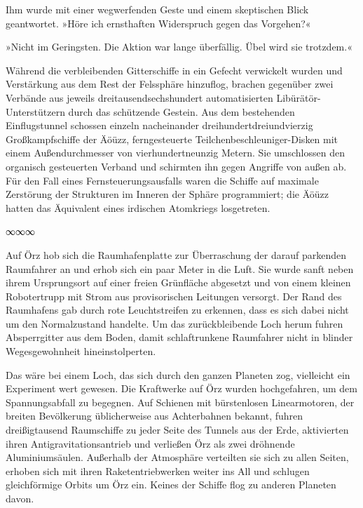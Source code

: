 Ihm wurde mit einer wegwerfenden Geste und einem skeptischen Blick geantwortet. »Höre ich ernsthaften Widerspruch gegen das Vorgehen?«

»Nicht im Geringsten. Die Aktion war lange überfällig. Übel wird sie trotzdem.«

Während die verbleibenden Gitterschiffe in ein Gefecht verwickelt wurden und Verstärkung aus dem Rest der Felssphäre hinzuflog, brachen gegenüber zwei Verbände aus jeweils dreitausendsechshundert automatisierten Libürätör-Unterstützern durch das schützende Gestein. Aus dem bestehenden Einflugstunnel schossen einzeln nacheinander dreihundertdreiundvierzig Großkampfschiffe der Äöüzz, ferngesteuerte Teilchenbeschleuniger-Disken mit einem Außendurchmesser von vierhundertneunzig Metern. Sie umschlossen den organisch gesteuerten Verband und schirmten ihn gegen Angriffe von außen ab. Für den Fall eines Fernsteuerungsausfalls waren die Schiffe auf maximale Zerstörung der Strukturen im Inneren der Sphäre programmiert; die Äöüzz hatten das Äquivalent eines irdischen Atomkriegs losgetreten.

\begin{center}
∞∞∞
\end{center}

Auf Örz hob sich die Raumhafenplatte zur Überraschung der darauf parkenden Raumfahrer an und erhob sich ein paar Meter in die Luft. Sie wurde sanft neben ihrem Ursprungsort auf einer freien Grünfläche abgesetzt und von einem kleinen Robotertrupp mit Strom aus provisorischen Leitungen versorgt. Der Rand des Raumhafens gab durch rote Leuchtstreifen zu erkennen, dass es sich dabei nicht um den Normalzustand handelte. Um das zurückbleibende Loch herum fuhren Absperrgitter aus dem Boden, damit schlaftrunkene Raumfahrer nicht in blinder Wegesgewohnheit hineinstolperten.

Das wäre bei einem Loch, das sich durch den ganzen Planeten zog, vielleicht ein Experiment wert gewesen. Die Kraftwerke auf Örz wurden hochgefahren, um dem Spannungsabfall zu begegnen. Auf Schienen mit bürstenlosen Linearmotoren, der breiten Bevölkerung üblicherweise aus Achterbahnen bekannt, fuhren dreißigtausend Raumschiffe zu jeder Seite des Tunnels aus der Erde, aktivierten ihren Antigravitationsantrieb und verließen Örz als zwei dröhnende Aluminiumsäulen. Außerhalb der Atmosphäre verteilten sie sich zu allen Seiten, erhoben sich mit ihren Raketentriebwerken weiter ins All und schlugen gleichförmige Orbits um Örz ein. Keines der Schiffe flog zu anderen Planeten davon.

